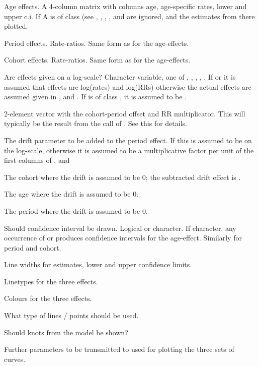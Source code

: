 \begin{Arguments}
\begin{ldescription}
\item[\code{A}] Age effects. A 4-column matrix with columns age, age-specific
rates, lower and upper c.i. If A is of class  (see
, , , ,
 and  are ignored, and the estimates from there
plotted.
\item[\code{P}] Period effects. Rate-ratios. Same form as for the age-effects.
\item[\code{C}] Cohort effects. Rate-ratios. Same form as for the age-effects.
\item[\code{scale}] Are effects given on a log-scale? Character variable, one
of , , , ,
. If  or  it is assumed that
effects are log(rates) and log(RRs) otherwise the actual effects are
assumed given in ,  and . If  is of
class , it is assumed to be .
\item[\code{frame.par}] 2-element vector with the cohort-period offset and
RR multiplicator. This will typically be the result from the call of
. See this for details.
\item[\code{drift}] The drift parameter to be added to the period effect. If
 this is assumed to be on the log-scale, otherwise
it is assumed to be a multiplicative factor per unit of the first
columns of  ,  and  
\item[\code{c0}] The cohort where the drift is assumed to be 0; the subtracted
drift effect is .
\item[\code{a0}] The age where the drift is assumed to be 0.
\item[\code{p0}] The period where the drift is assumed to be 0.
\item[\code{ci}] Should confidence interval be drawn. Logical or
character. If character, any occurrence of  or 
produces confidence intervals for the age-effect. Similarly for
period and cohort.
\item[\code{lwd}] Line widths for estimates, lower and upper confidence limits.
\item[\code{lty}] Linetypes for the three effects.
\item[\code{col}] Colours for the three effects.
\item[\code{type}] What type of lines / points should be used.
\item[\code{knots}] Should knots from the model be shown?
\item[\code{...}] Further parameters to be transmitted to  used
for plotting the three sets of curves.
\end{ldescription}
\end{Arguments}
